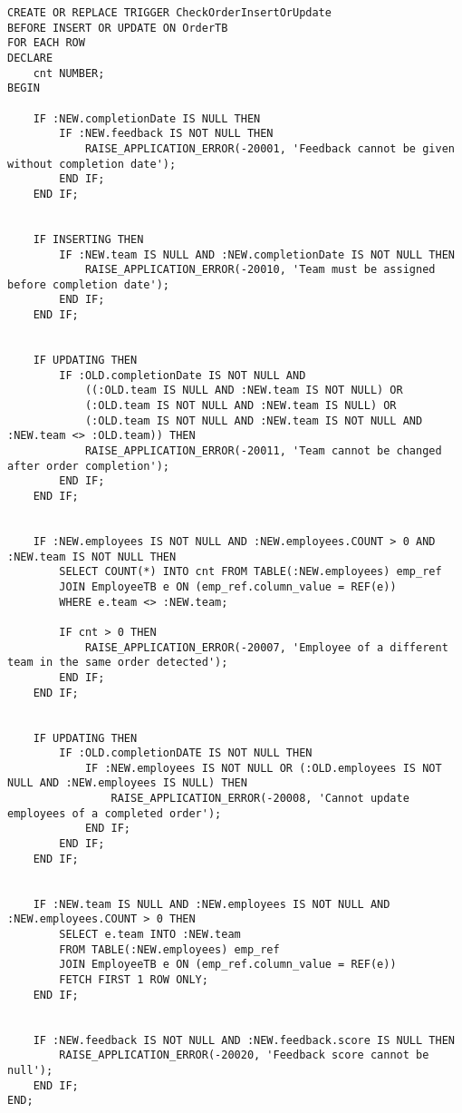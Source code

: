 \begin{lstlisting}
CREATE OR REPLACE TRIGGER CheckOrderInsertOrUpdate
BEFORE INSERT OR UPDATE ON OrderTB
FOR EACH ROW
DECLARE
    cnt NUMBER;
BEGIN
    
    IF :NEW.completionDate IS NULL THEN
        IF :NEW.feedback IS NOT NULL THEN
            RAISE_APPLICATION_ERROR(-20001, 'Feedback cannot be given without completion date');
        END IF;
    END IF;


    IF INSERTING THEN
        IF :NEW.team IS NULL AND :NEW.completionDate IS NOT NULL THEN
            RAISE_APPLICATION_ERROR(-20010, 'Team must be assigned before completion date');
        END IF;
    END IF;


    IF UPDATING THEN
        IF :OLD.completionDate IS NOT NULL AND 
            ((:OLD.team IS NULL AND :NEW.team IS NOT NULL) OR
            (:OLD.team IS NOT NULL AND :NEW.team IS NULL) OR
            (:OLD.team IS NOT NULL AND :NEW.team IS NOT NULL AND :NEW.team <> :OLD.team)) THEN
            RAISE_APPLICATION_ERROR(-20011, 'Team cannot be changed after order completion');
        END IF;
    END IF;


    IF :NEW.employees IS NOT NULL AND :NEW.employees.COUNT > 0 AND :NEW.team IS NOT NULL THEN
        SELECT COUNT(*) INTO cnt FROM TABLE(:NEW.employees) emp_ref
        JOIN EmployeeTB e ON (emp_ref.column_value = REF(e))
        WHERE e.team <> :NEW.team;

        IF cnt > 0 THEN
            RAISE_APPLICATION_ERROR(-20007, 'Employee of a different team in the same order detected');
        END IF;
    END IF;


    IF UPDATING THEN
        IF :OLD.completionDATE IS NOT NULL THEN
            IF :NEW.employees IS NOT NULL OR (:OLD.employees IS NOT NULL AND :NEW.employees IS NULL) THEN
                RAISE_APPLICATION_ERROR(-20008, 'Cannot update employees of a completed order');
            END IF;
        END IF;
    END IF;


    IF :NEW.team IS NULL AND :NEW.employees IS NOT NULL AND :NEW.employees.COUNT > 0 THEN
        SELECT e.team INTO :NEW.team
        FROM TABLE(:NEW.employees) emp_ref
        JOIN EmployeeTB e ON (emp_ref.column_value = REF(e))
        FETCH FIRST 1 ROW ONLY;
    END IF;


    IF :NEW.feedback IS NOT NULL AND :NEW.feedback.score IS NULL THEN
        RAISE_APPLICATION_ERROR(-20020, 'Feedback score cannot be null');
    END IF;
END;
\end{lstlisting}

